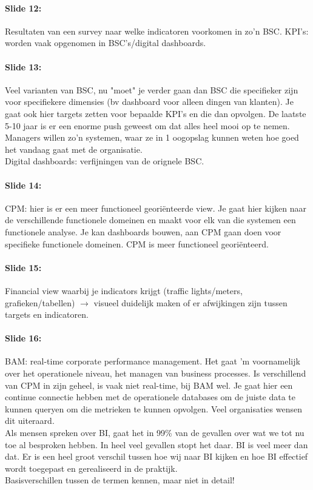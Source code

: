 \documentclass[10pt,a4paper]{report}
\begin{document}
\paragraph{Slide 12:}Resultaten van een survey naar welke indicatoren voorkomen in zo'n BSC. KPI's: worden vaak opgenomen in BSC's/digital dashboards.

\paragraph{Slide 13:}Veel varianten van BSC, nu "moet" je verder gaan dan BSC die specifieker zijn voor specifiekere dimensies (bv dashboard voor alleen dingen van klanten). Je gaat ook hier targets zetten voor bepaalde KPI's en die dan opvolgen. De laatste 5-10 jaar is er een enorme push geweest om dat alles heel mooi op te nemen. Managers willen zo'n systemen, waar ze in 1 oogopslag kunnen weten hoe goed het vandaag gaat met de organisatie.\\
Digital dashboards: verfijningen van de orignele BSC.

\paragraph{Slide 14:}CPM: hier is er een meer functioneel georiënteerde view. Je gaat hier kijken naar de verschillende functionele domeinen en maakt voor elk van die systemen een functionele analyse. Je kan dashboards bouwen, aan CPM gaan doen voor specifieke functionele domeinen. CPM is meer functioneel geori\"enteerd.

\paragraph{Slide 15:}Financial view waarbij je indicators krijgt (traffic lights/meters, grafieken/tabellen) $\rightarrow$ visueel duidelijk maken of er afwijkingen zijn tussen targets en indicatoren.

\paragraph{Slide 16:}BAM: real-time corporate performance management. Het gaat 'm voornamelijk over het operationele niveau, het managen van business processes. Is verschillend van CPM in zijn geheel, is vaak niet real-time, bij BAM wel. Je gaat hier een continue connectie hebben met de operationele databases om de juiste data te kunnen queryen om die metrieken te kunnen opvolgen. Veel organisaties wensen dit uiteraard.\\
Als mensen spreken over BI, gaat het in 99\% van de gevallen over wat we tot nu toe al besproken hebben. In heel veel gevallen stopt het daar. BI is veel meer dan dat. Er is een heel groot verschil tussen hoe wij naar BI kijken en hoe BI effectief wordt toegepast en gerealiseerd in de praktijk.\\
Basisverschillen tussen de termen kennen, maar niet in detail!
\end{document}
